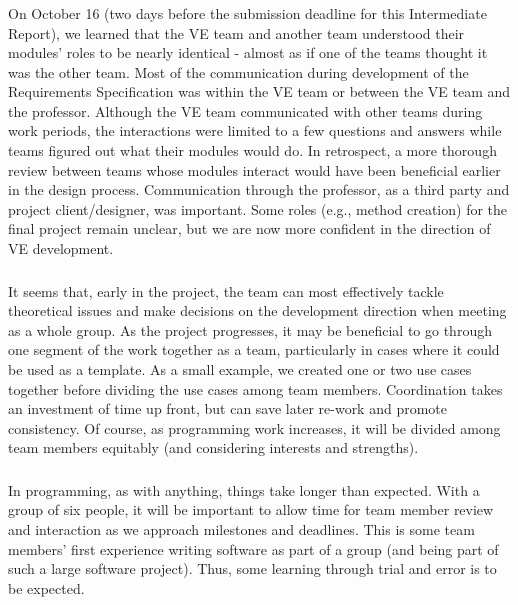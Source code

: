\documentclass{llncs}
\begin{document}
\subsubsection{}
On October 16 (two days before the submission deadline for this Intermediate Report), we learned that the VE team and another team understood their modules’ roles to be nearly identical - almost as if one of the teams thought it was the other team.  Most of the communication during development of the Requirements Specification was within the VE team or between the VE team and the professor.  Although the VE team communicated with other teams during work periods, the interactions were limited to a few questions and answers while teams figured out what their modules would do.  In retrospect, a more thorough review between teams whose modules interact would have been beneficial earlier in the design process.  Communication through the professor, as a third party and project client/designer, was important.  Some roles (e.g., method creation) for the final project remain unclear, but we are now more confident in the direction of VE development.  

\subsubsection{}
It seems that, early in the project, the team can most effectively tackle theoretical issues and make decisions on the development direction when meeting as a whole group.  As the project progresses, it may be beneficial to go through one segment of the work together as a team, particularly in cases where it could be used as a template.  As a small example, we created one or two use cases together before dividing the use cases among team members.  Coordination takes an investment of time up front, but can save later re-work and promote consistency.  Of course, as programming work increases, it will be divided among team members equitably (and considering interests and strengths).  

\subsubsection{}
In programming, as with anything, things take longer than expected. With a group of six people, it will be important to allow time for team member review and interaction as we approach milestones and deadlines.  This is some team members’ first experience writing software as part of a group (and being part of such a large software project).  Thus, some learning through trial and error is to be expected.
\end{document}
